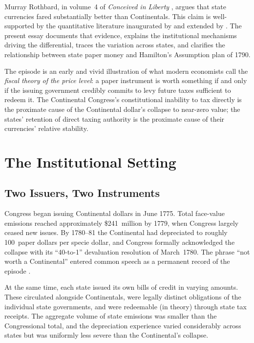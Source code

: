\documentclass[12pt]{article}
\begin{document}
Murray Rothbard, in volume~4 of \textit{Conceived in Liberty}
\citep{Rothbard1979}, argues that state currencies fared substantially better
than Continentals.  This claim is well-supported by the quantitative literature
inaugurated by \citet{Ferguson1961} and extended by \citet{Grubb2008,Grubb2012,
Grubb2003}.  The present essay documents that evidence, explains the
institutional mechanisms driving the differential, traces the variation across
states, and clarifies the relationship between state paper money and Hamilton's
Assumption plan of 1790.

The episode is an early and vivid illustration of what modern economists call
the \emph{fiscal theory of the price level}: a paper instrument is worth
something if and only if the issuing government credibly commits to levy
future taxes sufficient to redeem it.  The Continental Congress's
constitutional inability to tax directly is the proximate cause of the
Continental dollar's collapse to near-zero value; the states' retention of
direct taxing authority is the proximate cause of their currencies'
relative stability.

\section{The Institutional Setting}

\subsection{Two Issuers, Two Instruments}

Congress began issuing Continental dollars in June 1775.  Total face-value
emissions reached approximately \$241~million by 1779, when Congress largely
ceased new issues.  By 1780--81 the Continental had depreciated to roughly
100~paper dollars per specie dollar, and Congress formally acknowledged
the collapse with its ``40-to-1'' devaluation resolution of March~1780.  The
phrase ``not worth a Continental'' entered common speech as a permanent record
of the episode \citep{Ferguson1961, Timberlake1993}.

At the same time, each state issued its own bills of credit in varying amounts.
These circulated alongside Continentals, were legally distinct obligations
of the individual state governments, and were redeemable (in theory) through
state tax receipts.  The aggregate volume of state emissions was smaller than
the Congressional total, and the depreciation experience varied considerably
across states but was uniformly less severe than the Continental's collapse.
\end{document}
